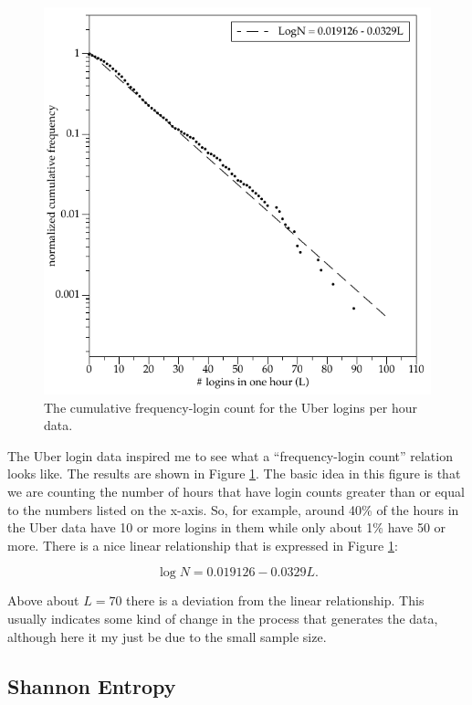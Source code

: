 \documentclass{tufte-handout}
\begin{document}
\begin{figure}[h]
	\includegraphics[width=\linewidth]{flc.pdf}%
	\caption{The cumulative frequency-login count for the Uber logins per hour data.}%
	\label{fig:flc}%
\end{figure}

The Uber login data inspired me to see what a ``frequency-login count'' relation looks like. The results are shown in Figure \ref{fig:flc}. The basic idea in this figure is that we are counting the number of hours that have login counts greater than or equal to the numbers listed on the x-axis. So, for example, around 40\% of the hours in the Uber data have 10 or more logins in them while only about 1\% have 50 or more. There is a nice linear relationship that is expressed in Figure \ref{fig:flc}:

\begin{equation}
        \log N = 0.019126 -0.0329 L
        \label{eq:gr}.
\end{equation}


Above about $L = 70$ there is a deviation from the linear relationship. This usually indicates some kind of change in the process that generates the data, although here it my just be due to the small sample size.

\subsection{Shannon Entropy}
\end{document}
